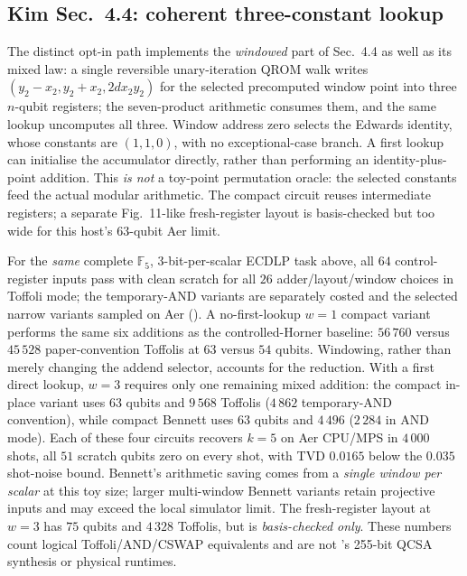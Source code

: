 \subsection{Kim Sec.~4.4: coherent three-constant lookup}
\label{ec:sec:kim-edwards-qrom}

The distinct opt-in  path implements the
\emph{windowed} part of \cite{ec:kim26} Sec.~4.4 as well as its mixed law:
a single reversible unary-iteration QROM walk writes
$(y_2-x_2,y_2+x_2,2dx_2y_2)$ for the selected precomputed window point
into three $n$-qubit registers; the seven-product arithmetic consumes them,
and the same lookup uncomputes all three. Window address zero selects the
Edwards identity, whose constants are $(1,1,0)$, with no exceptional-case
branch. A first lookup can initialise the accumulator directly, rather than
performing an identity-plus-point addition. This \emph{is not} a toy-point
permutation oracle: the selected constants feed the actual modular
arithmetic. The compact circuit reuses intermediate registers; a separate
Fig.~11-like fresh-register layout is basis-checked but too wide for this
host's $63$-qubit Aer limit.

For the \emph{same} complete $\mathbb F_5$, $3$-bit-per-scalar ECDLP task above,
all $64$ control-register inputs pass with clean scratch for all $26$
adder/layout/window choices in Toffoli mode; the temporary-AND variants
are separately costed and the selected narrow variants sampled on Aer
(). A no-first-lookup $w=1$ compact
variant performs the same six additions as the controlled-Horner baseline:
$56\,760$ versus $45\,528$ paper-convention Toffolis at $63$ versus
$54$ qubits. Windowing, rather than merely changing the addend selector,
accounts for the reduction. With a first direct lookup, $w=3$ requires
only one remaining mixed addition: the compact in-place variant uses
$63$ qubits and $9\,568$ Toffolis ($4\,862$ temporary-AND convention),
while compact Bennett uses $63$ qubits and $4\,496$ ($2\,284$ in AND
mode). Each of these four circuits recovers $k=5$ on Aer CPU/MPS in
$4\,000$ shots, all $51$ scratch qubits zero on every shot, with TVD
$0.0165$ below the $0.035$ shot-noise bound. Bennett's arithmetic saving
comes from a \emph{single window per scalar} at this toy size; larger
multi-window Bennett variants retain projective inputs and may exceed
the local simulator limit. The fresh-register layout at $w=3$ has
$75$ qubits and $4\,328$ Toffolis, but is \emph{basis-checked only}.
These numbers count logical Toffoli/AND/CSWAP equivalents and are not
\cite{ec:kim26}'s 255-bit QCSA synthesis or physical runtimes.


